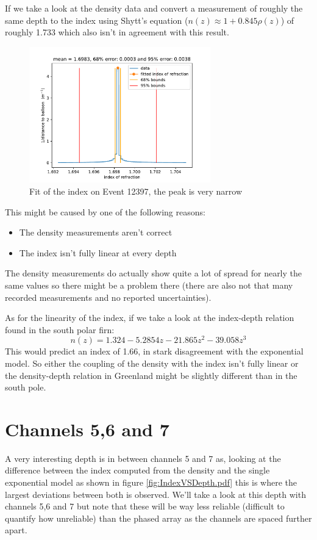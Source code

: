 If we take a look at the density data and convert a measurement of
roughly the same depth to the index using Shytt's equation ($n(z) \approx 1 + 0.845\rho(z)$)
of roughly 1.733 which also isn't in agreement with this result.
\begin{figure}
	\centering
	\includegraphics[width=0.7\textwidth]{figures/Event12397.pdf}
  \caption{Fit of the index on Event 12397, the peak is very narrow}
	\label{fig:Event12397}
\end{figure}
This might be caused by one of the following reasons:
\begin{itemize}
	\item The density measurements aren't correct
	\item The index isn't fully linear at every depth
\end{itemize}
The density measurements do actually show quite a lot of spread for
nearly the same values so there might be a problem there (there are
also not that many recorded measurements and no reported
uncertainties).  

As for the linearity of the index, if we take a look at the
index-depth relation found in the south polar
firn\cite{kravchenko_besson_meyers_2004}:
\begin{equation}
	n(z) = 1.324 - 5.2854z - 21.865z^2 - 39.058z^3
\end{equation}
This would predict an index of 1.66, in stark disagreement with the
exponential model. So either the coupling of the density with the
index isn't fully linear or the density-depth relation in Greenland
might be slightly different than in the south pole.

\section{Channels 5,6 and 7}
A very interesting depth is in between channels 5 and 7 as, looking at the
difference between the index computed from the density and the single
exponential model as shown in figure \ref{fig:IndexVSDepth.pdf} this is where
the largest deviations between both is observed. We'll take a look at this
depth with channels 5,6 and 7 but note  that these will be way less reliable
(difficult to quantify how unreliable) than the phased array as the channels
are spaced further apart. 

